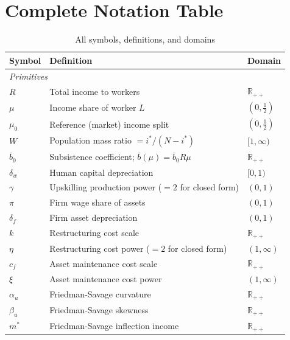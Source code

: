 \documentclass[12pt,a4paper]{article}
\begin{document}
\appendix
\section{Complete Notation Table}

\begin{table}[h!]
\centering
\caption{All symbols, definitions, and domains}
\label{tab:notation}
\renewcommand{\arraystretch}{1.15}
\begin{tabular}{lp{8.2cm}l}
\toprule
Symbol & Definition & Domain \\
\midrule
\multicolumn{3}{l}{\textit{Primitives}} \\
$R$           & Total income to workers                          & $\mathbb{R}_{++}$ \\
$\mu$         & Income share of worker $L$                       & $(0,\tfrac{1}{2})$ \\
$\mu_0$       & Reference (market) income split                  & $(0,\tfrac{1}{2})$ \\
$W$           & Population mass ratio $= i^*/(N-i^*)$            & $[1,\infty)$ \\
$\bar{b}_0$   & Subsistence coefficient; $\bar{b}(\mu)=\bar{b}_0 R\mu$ & $\mathbb{R}_{++}$ \\
$\delta_w$    & Human capital depreciation                       & $[0,1)$ \\
$\gamma$      & Upskilling production power ($=2$ for closed form) & $(0,1)$ \\
$\pi$         & Firm wage share of assets                        & $(0,1)$ \\
$\delta_f$    & Firm asset depreciation                          & $(0,1)$ \\
$k$           & Restructuring cost scale                         & $\mathbb{R}_{++}$ \\
$\eta$        & Restructuring cost power ($=2$ for closed form)  & $(1,\infty)$ \\
$c_f$         & Asset maintenance cost scale                     & $\mathbb{R}_{++}$ \\
$\xi$         & Asset maintenance cost power                     & $(1,\infty)$ \\
$\alpha_u$    & Friedman-Savage curvature                        & $\mathbb{R}_{++}$ \\
$\beta_u$     & Friedman-Savage skewness                         & $\mathbb{R}_{++}$ \\
$m^*$         & Friedman-Savage inflection income                & $\mathbb{R}_{++}$ \\

\end{tabular}
\end{table}
\end{document}
